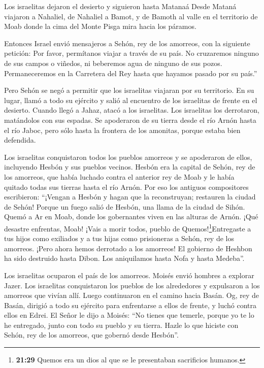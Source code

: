 Los israelitas dejaron el desierto y siguieron hasta Matanaá
 Desde Mataná viajaron a Nahaliel, de Nahaliel a Bamot,
 y de Bamoth al valle en el territorio de Moab donde la
cima del Monte Pisga mira hacia los páramos.

 Entonces Israel envió mensajeros a Sehón, rey de los
amorreos, con la siguiente petición:  Por favor, permítanos
viajar a través de su país. No cruzaremos ninguno de sus campos o
viñedos, ni beberemos agua de ninguno de sus pozos. Permaneceremos en la
Carretera del Rey hasta que hayamos pasado por su país.''

 Pero Sehón se negó a permitir que los israelitas viajaran
por su territorio. En su lugar, llamó a todo su ejército y salió al
encuentro de los israelitas de frente en el desierto. Cuando llegó a
Jahaz, atacó a los israelitas.  Los israelitas los
derrotaron, matándolos con sus espadas. Se apoderaron de su tierra desde
el río Arnón hasta el río Jaboc, pero sólo hasta la frontera de los
amonitas, porque estaba bien defendida.

 Los israelitas conquistaron todos los pueblos amorreos y
se apoderaron de ellos, incluyendo Hesbón y sus pueblos vecinos.
 Hesbón era la capital de Sehón, rey de los amorreos, que
había luchado contra el anterior rey de Moab y le había quitado todas
sus tierras hasta el río Arnón.  Por eso los antiguos
compositores escribieron: ``¡Vengan a Hesbón y hagan que la
reconstruyan; restauren la ciudad de Sehón!  Porque un
fuego salió de Hesbón, una llama de la ciudad de Sihón. Quemó a Ar en
Moab, donde los gobernantes viven en las alturas de Arnón. 
¡Qué desastre enfrentas, Moab! ¡Vais a morir todos, pueblo de
Quemos!\footnote{\textbf{21:29} Quemos era un dios al que se le
  presentaban sacrificios humanos.}Entregaste a tus hijos como exiliados
y a tus hijas como prisioneras a Sehón, rey de los amorreos.
 ¡Pero ahora hemos derrotado a los amorreos! El gobierno de
Heshbon ha sido destruido hasta Dibon. Los aniquilamos hasta Nofa y
hasta Medeba''.

 Los israelitas ocuparon el país de los amorreos.
 Moisés envió hombres a explorar Jazer. Los israelitas
conquistaron los pueblos de los alrededores y expulsaron a los amorreos
que vivían allí.  Luego continuaron en el camino hacia
Basán. Og, rey de Basán, dirigió a todo su ejército para enfrentarse a
ellos de frente, y luchó contra ellos en Edrei.  El Señor
le dijo a Moisés: ``No tienes que temerle, porque yo te lo he entregado,
junto con todo su pueblo y su tierra. Hazle lo que hiciste con Sehón,
rey de los amorreos, que gobernó desde Hesbón''.

